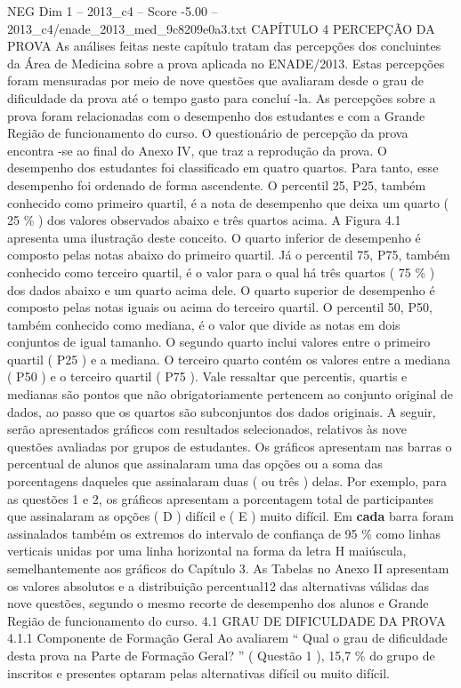 \begin{textsample}{NEG Dim 1 – 2013\_c4 – Score -5.00 – 2013\_c4/enade\_2013\_med\_9c8209e0a3.txt}  \label{ex:f1_neg_059}
CAPÍTULO 4 PERCEPÇÃO DA PROVA As análises feitas neste capítulo tratam das percepções dos concluintes da Área de Medicina sobre a prova aplicada no ENADE/2013.
Estas percepções foram mensuradas por meio de nove questões que avaliaram desde o grau de dificuldade da prova até o tempo gasto para concluí -la.
As percepções sobre a prova foram relacionadas com o desempenho dos estudantes e com a Grande Região de funcionamento do curso.
O questionário de percepção da prova encontra -se ao final do Anexo IV, que traz a reprodução da prova.
O desempenho dos estudantes foi classificado em quatro quartos.
Para tanto, esse desempenho foi ordenado de forma ascendente.
O percentil 25, P25, também conhecido como primeiro quartil, é a nota de desempenho que deixa um quarto ( 25 \% ) dos valores observados abaixo e três quartos acima.
A Figura 4.1 apresenta uma ilustração deste conceito.
O quarto inferior de desempenho é composto pelas notas abaixo do primeiro quartil.
Já o percentil 75, P75, também conhecido como terceiro quartil, é o valor para o qual há três quartos ( 75 \% ) dos dados abaixo e um quarto acima dele.
O quarto superior de desempenho é composto pelas notas iguais ou acima do terceiro quartil.
O percentil 50, P50, também conhecido como mediana, é o valor que divide as notas em dois conjuntos de igual tamanho.
O segundo quarto inclui valores entre o primeiro quartil ( P25 ) e a mediana.
O terceiro quarto contém os valores entre a mediana ( P50 ) e o terceiro quartil ( P75 ).
Vale ressaltar que percentis, quartis e medianas são pontos que não obrigatoriamente pertencem ao conjunto original de dados, ao passo que os quartos são subconjuntos dos dados originais.
A seguir, serão apresentados gráficos com resultados selecionados, relativos às nove questões avaliadas por grupos de estudantes.
Os gráficos apresentam nas barras o percentual de alunos que assinalaram uma das opções ou a soma das porcentagens daqueles que assinalaram duas ( ou três ) delas.
Por exemplo, para as questões 1 e 2, os gráficos apresentam a porcentagem total de participantes que assinalaram as opções ( D ) difícil e ( E ) muito difícil.
Em \textbf{cada} barra foram assinalados também os extremos do intervalo de confiança de 95 \% como linhas verticais unidas por uma linha horizontal na forma da letra H maiúscula, semelhantemente aos gráficos do Capítulo 3.
As Tabelas no Anexo II apresentam os valores absolutos e a distribuição percentual12 das alternativas válidas das nove questões, segundo o mesmo recorte de desempenho dos alunos e Grande Região de funcionamento do curso. 4.1 GRAU DE DIFICULDADE DA PROVA 4.1.1 Componente de Formação Geral Ao avaliarem “ Qual o grau de dificuldade desta prova na Parte de Formação Geral? ” ( Questão 1 ), 15,7 \% do grupo de inscritos e presentes optaram pelas alternativas difícil ou muito difícil.

\end{textsample}
